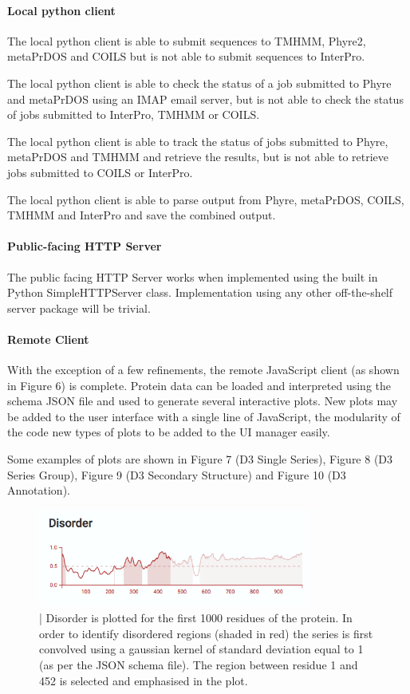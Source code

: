 \documentclass[fleqn,10pt]{article} %
\begin{document}
\paragraph{Local python client}

The local python client is able to submit sequences to TMHMM, Phyre2, metaPrDOS and COILS but is not able to submit sequences to InterPro.

The local python client is able to check the status of a job submitted to Phyre and metaPrDOS using an IMAP email server, but is not able to check the status of jobs submitted to InterPro, TMHMM or COILS.

The local python client is able to track the status of jobs submitted to Phyre, metaPrDOS and TMHMM and retrieve the results, but is not able to retrieve jobs submitted to COILS or InterPro.

The local python client is able to parse output from Phyre, metaPrDOS, COILS, TMHMM and InterPro and save the combined output.

\paragraph{Public-facing HTTP Server}

The public facing HTTP Server works when implemented using the built in Python SimpleHTTPServer class. Implementation using any other off-the-shelf server package will be trivial.

\paragraph{Remote Client}

With the exception of a few refinements, the remote JavaScript client (as shown in Figure 6) is complete. Protein data can be loaded and interpreted using the schema JSON file and used to generate several interactive plots. New plots may be added to the user interface with a single line of JavaScript, the modularity of the code new types of plots to be added to the UI manager easily.

Some examples of plots are shown in Figure 7 (D3 Single Series), Figure 8 (D3 Series Group), Figure 9 (D3 Secondary Structure) and Figure 10 (D3 Annotation). 

\begin{figure}
\includegraphics[width=9cm]{figs/seriesplot}
\caption{ | Disorder is plotted for the first 1000 residues of the protein. In order to identify disordered regions (shaded in red) the series is first convolved using a gaussian kernel of standard deviation equal to 1 (as per the JSON schema file). The region between residue 1 and 452 is selected and emphasised in the plot.}
\end{figure}
\end{document}
